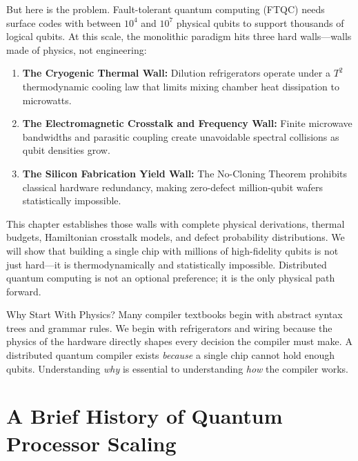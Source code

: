 But here is the problem. Fault-tolerant quantum computing (FTQC) needs surface codes with between $10^4$ and $10^7$ physical qubits to support thousands of logical qubits. At this scale, the monolithic paradigm hits three hard walls---walls made of physics, not engineering:
\begin{enumerate}
    \item \textbf{The Cryogenic Thermal Wall:} Dilution refrigerators operate under a $T^2$ thermodynamic cooling law that limits mixing chamber heat dissipation to microwatts.
    \item \textbf{The Electromagnetic Crosstalk and Frequency Wall:} Finite microwave bandwidths and parasitic coupling create unavoidable spectral collisions as qubit densities grow.
    \item \textbf{The Silicon Fabrication Yield Wall:} The No-Cloning Theorem prohibits classical hardware redundancy, making zero-defect million-qubit wafers statistically impossible.
\end{enumerate}

This chapter establishes those walls with complete physical derivations, thermal budgets, Hamiltonian crosstalk models, and defect probability distributions. We will show that building a single chip with millions of high-fidelity qubits is not just hard---it is thermodynamically and statistically impossible. Distributed quantum computing is not an optional preference; it is the only physical path forward.

\begin{insightbox}{Why Start With Physics?}
Many compiler textbooks begin with abstract syntax trees and grammar rules. We begin with refrigerators and wiring because the physics of the hardware directly shapes every decision the compiler must make. A distributed quantum compiler exists \textit{because} a single chip cannot hold enough qubits. Understanding \textit{why} is essential to understanding \textit{how} the compiler works.
\end{insightbox}


\section{A Brief History of Quantum Processor Scaling}
\label{sec:scaling_history}

